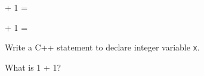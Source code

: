 

\renewcommand\AUTHOR{jdoe5@cougars.ccis.edu} %


\topmattertwo

 + 1 = \answerbox{ }

 + 1 = \dotfill\answerbox{ }

\nextq
Write a C++ statement to declare integer variable \verb!x!.
\\
\ANSWER
\begin{answercode}

\end{answercode}

\nextq
What is 1 + 1?
\\
\ANSWER
\begin{answerlong}

\end{answerlong}

\newpage


